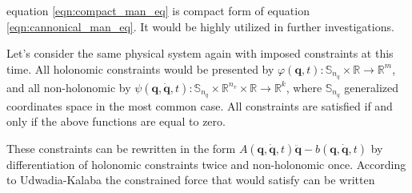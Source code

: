 equation \ref{eqn:compact_man_eq} is compact form of equation 
\ref{eqn:cannonical_man_eq}. It would be highly utilized in further 
investigations.

Let's consider the same physical system again with imposed constraints at this time.
All holonomic constraints would be presented by 
$\varphi(\mathbf{q}, t): \mathbb{S}_{n_q} \times \mathbb{R} \rightarrow \mathbb{R}^m$, and 
all non-holonomic by 
$
\psi(\mathbf{q}, \dot{\mathbf{q}}, t): \mathbb{S}_{n_q} \times \mathbb{R}^{n_v} 
\times \mathbb{R} \rightarrow \mathbb{R}^k
$, where $\mathbb{S}_{n_q}$ generalized coordinates space in the most common case.
All constraints are satisfied if and only if the above functions are equal to zero.

These constraints can be rewritten in the form 
$
A(\mathbf{q}, \dot{\mathbf{q}}, t) \ddot{\mathbf{q}} 
- b(\mathbf{q}, \dot{\mathbf{q}}, t)
$
by differentiation of holonomic constraints twice and non-holonomic once.
According to Udwadia-Kalaba the constrained force that would satisfy can be 
written


